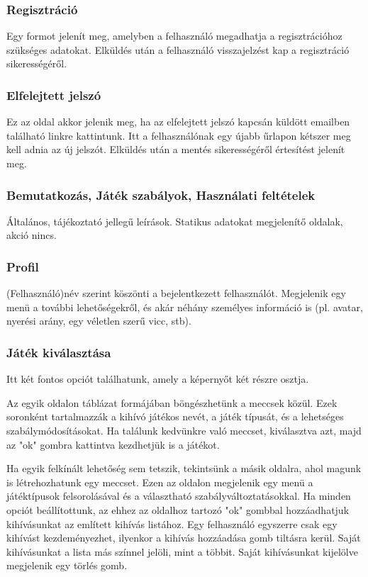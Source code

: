 \subsubsection{Regisztráció}
Egy formot jelenít meg, amelyben a felhasználó megadhatja a regisztrációhoz szükséges adatokat. Elküldés után a felhasználó visszajelzést kap a regisztráció sikerességéről.

\subsubsection{Elfelejtett jelszó}
Ez az oldal akkor jelenik meg, ha az elfelejtett jelszó kapcsán küldött emailben található linkre kattintunk. Itt a felhasználónak egy újabb űrlapon kétszer meg kell adnia az új jelszót. Elküldés után a mentés sikerességéről értesítést jelenít meg.

\subsubsection{Bemutatkozás, Játék szabályok, Használati feltételek}
Általános, tájékoztató jellegű leírások. Statikus adatokat megjelenítő oldalak, akció nincs.

\subsubsection{Profil}
(Felhasználó)név szerint köszönti a bejelentkezett felhasználót. Megjelenik egy menü a további lehetőségekről, és akár néhány személyes információ is (pl. avatar, nyerési arány, egy véletlen szerű vicc, stb).

\subsubsection{Játék kiválasztása}
Itt két fontos opciót találhatunk, amely a képernyőt két részre osztja.

Az egyik oldalon táblázat formájában böngészhetünk a meccsek közül. Ezek soronként tartalmazzák a kihívó játékos nevét, a játék típusát, és a lehetséges szabálymódosításokat. Ha találunk kedvünkre való meccset, kiválasztva azt, majd az "ok" gombra kattintva kezdhetjük is a játékot.

Ha egyik felkínált lehetőség sem tetszik, tekintsünk a másik oldalra, ahol magunk is létrehozhatunk egy meccset. Ezen az oldalon megjelenik egy menü a játéktípusok felsorolásával és a választható szabályváltoztatásokkal. Ha minden opciót beállítottunk, az ehhez az oldalhoz tartozó "ok" gombbal hozzáadhatjuk kihívásunkat az említett kihívás listához. Egy felhasználó egyszerre csak egy kihívást kezdeményezhet, ilyenkor a kihívás hozzáadása gomb tiltásra kerül. Saját kihívásunkat a lista más színnel jelöli, mint a többit. Saját kihívásunkat kijelölve megjelenik egy törlés gomb. 

